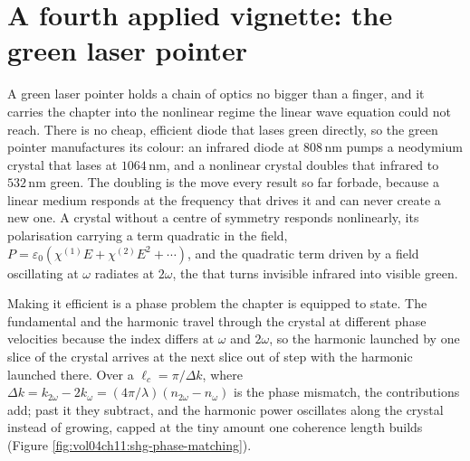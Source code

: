 \section{A fourth applied vignette: the green laser pointer}

A green laser pointer holds a chain of optics no bigger than a finger, and it
carries the chapter into the nonlinear regime the linear wave equation could not
reach. There is no cheap, efficient diode that lases green directly, so the green
pointer manufactures its colour: an infrared diode at $808\,\si{\nano\meter}$
pumps a neodymium crystal that lases at $1064\,\si{\nano\meter}$, and a nonlinear
crystal doubles that infrared to $532\,\si{\nano\meter}$ green. The doubling is
the move every result so far forbade, because a linear medium responds at the
frequency that drives it and can never create a new one. A crystal without a
centre of symmetry responds nonlinearly, its polarisation carrying a term
quadratic in the field, $P = \varepsilon_0(\chi^{(1)}E + \chi^{(2)}E^2 + \cdots)$,
and the quadratic term driven by a field oscillating at $\omega$ radiates at
$2\omega$, the  that turns invisible infrared
into visible green.

Making it efficient is a phase problem the chapter is equipped to state. The
fundamental and the harmonic travel through the crystal at different phase
velocities because the index differs at $\omega$ and $2\omega$, so the harmonic
launched by one slice of the crystal arrives at the next slice out of step with
the harmonic launched there. Over a 
$\ell_c = \pi/\Delta k$, where $\Delta k = k_{2\omega} - 2k_\omega =
(4\pi/\lambda)(n_{2\omega} - n_\omega)$ is the phase mismatch, the contributions
add; past it they subtract, and the harmonic power oscillates along the crystal
instead of growing, capped at the tiny amount one coherence length builds (Figure
\ref{fig:vol04ch11:shg-phase-matching}).



